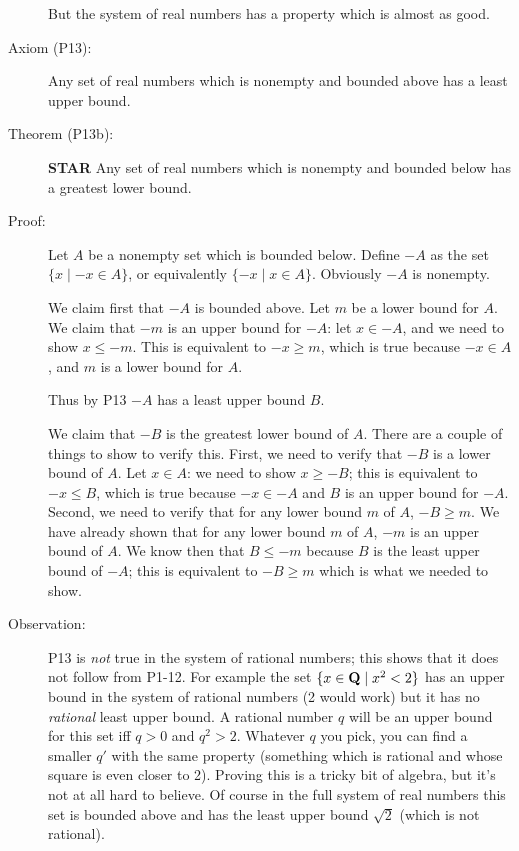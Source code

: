 \documentclass[12pt]{article}
\begin{document}
\begin{description}
But the system of real numbers has a property which is almost as good.

\item[Axiom (P13):]  Any set of real numbers which is nonempty and bounded above has a least upper bound.

\item[Theorem (P13b):]  {\bf STAR}  Any set of real numbers which is nonempty and bounded below has a greatest lower bound.

\item[Proof:]  Let $A$ be a nonempty set which is bounded below.  Define $-A$ as the set \newline $\{x \mid -x \in A\}$, or equivalently $\{-x \mid x \in A\}$.  Obviously $-A$ is nonempty.

We claim first that $-A$ is bounded above.  Let $m$ be a lower bound for $A$.  We claim that $-m$ is an upper bound for $-A$:  let $x \in -A$, and we need to show $x \leq -m$.  This is equivalent to $-x \geq m$, which is true
because $-x \in A$, and $m$ is a lower bound for $A$.

Thus by P13 $-A$ has a least upper bound $B$.

We claim that $-B$ is the greatest lower bound of $A$.  There are a couple of things to show to verify this.  First, we need to verify that $-B$ is a lower bound of $A$.  Let $x \in A$:  we need to show $x \geq -B$; this is equivalent to $-x \leq B$, which is true because $-x \in -A$ and $B$ is an upper bound for $-A$.  Second, we need to verify that for any lower bound $m$ of $A$, $-B \geq m$.  We have already shown that for any lower bound $m$ of $A$, $-m$ is an upper bound of $A$.
We know then that $B \leq -m$ because $B$ is the least upper bound of $-A$; this is equivalent to $-B \geq m$ which is what we needed to show.

\item[Observation:]  P13 is {\em not\/} true in the system of rational numbers; this shows that it does not follow from P1-12.  For example the set \newline $\{x \in {\bf Q}\mid x^2<2\}$ has an upper bound in the system of rational numbers (2 would work)
but it has no {\em rational\/} least upper bound.  A rational number $q$ will be an upper bound for this set iff $q>0$ and $q^2>2$.  Whatever $q$ you pick, you can find a smaller $q'$ with the same property (something which is rational and
whose square is even closer to 2).  Proving this is a tricky bit of algebra, but it's not at all hard to believe.  Of course in the full system of real numbers this set is bounded above and has the least upper bound $\sqrt 2$ (which is not rational).


\end{description}
\end{document}
